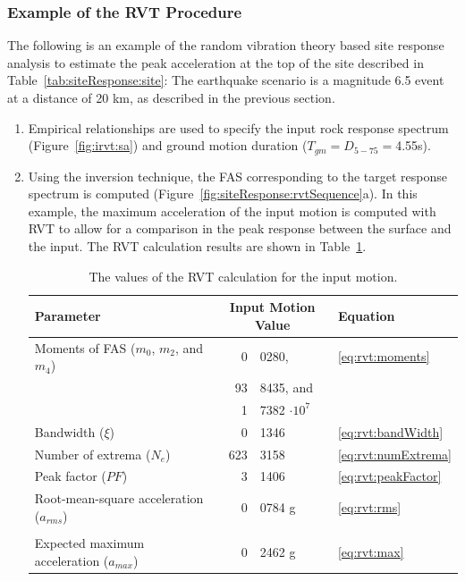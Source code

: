 \documentclass[11pt]{report}
\begin{document}
\subsubsection{Example of the RVT Procedure}
The following is an example of the random vibration theory based site response analysis to estimate
the peak acceleration at the top of the site described in Table~\ref{tab:siteResponse:site}:  The
earthquake scenario is a magnitude 6.5 event at a distance of 20 km, as described in the previous
section.
\begin{enumerate}
  \item Empirical relationships are used to specify the input rock response spectrum
	  (Figure~\ref{fig:irvt:sa}) and ground motion duration ($T_{gm}=D_{5-75}=$4.55s).
  \item Using the inversion technique, the FAS corresponding to the target response spectrum is
	computed (Figure~\ref{fig:siteResponse:rvtSequence}a). In this example, the maximum acceleration
	of the input motion is computed with RVT to allow for a comparison in the peak response between the surface and the
	input.  The RVT calculation results are shown in Table~\ref{tab:rvtSequence:input}.

	\begin{table}[h]
	  \centering
	  \begin{tabular}{l r @{.} l l}
		\hline\hline
		\textbf{Parameter} & \multicolumn{2}{c}{\textbf{Input Motion Value}} & \textbf{Equation} \\
		\hline
		Moments of FAS ($m_0$, $m_2$, and $m_4$) & 0&0280, & \ref{eq:rvt:moments} \\
		& 93&8435, and \\
		& 1&7382 $\cdot 10^7$  \\
		Bandwidth ($\xi$) & 0&1346 & \ref{eq:rvt:bandWidth} \\
		Number of extrema ($N_e$) & 623&3158 & \ref{eq:rvt:numExtrema} \\
		Peak factor ($PF$) & 3&1406 & \ref{eq:rvt:peakFactor} \\
		Root-mean-square acceleration ($a_{rms}$) & 0&0784 g & \ref{eq:rvt:rms} \\
		\\
		Expected maximum acceleration ($a_{max}$) & 0&2462 g & \ref{eq:rvt:max} \\
		\hline\hline
	  \end{tabular}
	  \caption{The values of the RVT calculation for the input motion.}
	  \label{tab:rvtSequence:input}
	\end{table}


\end{enumerate}
\end{document}
